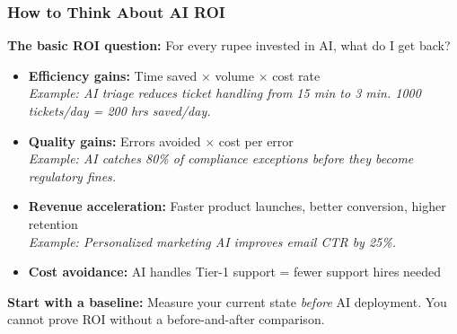 \begin{frame}[fragile]\frametitle{How to Think About AI ROI}

\textbf{The basic ROI question:} For every rupee invested in AI, what do I get back?

\begin{itemize}
  \item \textbf{Efficiency gains:} Time saved $\times$ volume $\times$ cost rate\\
    \textit{Example: AI triage reduces ticket handling from 15 min to 3 min. 1000 tickets/day = 200 hrs saved/day.}
  \item \textbf{Quality gains:} Errors avoided $\times$ cost per error\\
    \textit{Example: AI catches 80\% of compliance exceptions before they become regulatory fines.}
  \item \textbf{Revenue acceleration:} Faster product launches, better conversion, higher retention\\
    \textit{Example: Personalized marketing AI improves email CTR by 25\%.}
  \item \textbf{Cost avoidance:} AI handles Tier-1 support = fewer support hires needed
\end{itemize}

\textbf{Start with a baseline:} Measure your current state \textit{before} AI deployment. You cannot prove ROI without a before-and-after comparison.

\end{frame}

